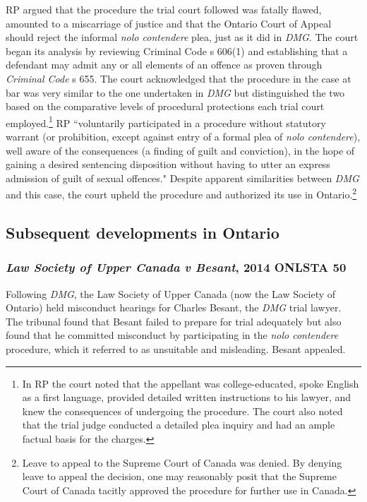 RP argued that the procedure the trial court followed was fatally flawed, amounted to a miscarriage of justice and that the Ontario Court of Appeal should reject the informal \textit{nolo contendere} plea, just as it did in \textit{DMG}. The court began its analysis by reviewing Criminal Code s 606(1) and establishing that a defendant may admit any or all elements of an offence as proven through \textit{Criminal Code} s 655. The court acknowledged that the procedure in the case at bar was very similar to the one undertaken in \textit{DMG} but distinguished the two based on the comparative levels of procedural protections each trial court employed.\footnote{In RP the court noted that the appellant was college-educated, spoke English as a first language, provided detailed written instructions to his lawyer, and knew the consequences of undergoing the procedure. The court also noted that the trial judge conducted a detailed plea inquiry and had an ample factual basis for the charges.} RP ``voluntarily participated in a procedure without statutory warrant (or prohibition, except against entry of a formal plea of \textit{nolo contendere}), well aware of the consequences (a finding of guilt and conviction), in the hope of gaining a desired sentencing disposition without having to utter an express admission of guilt of sexual offences." Despite apparent similarities between \textit{DMG} and this case, the court upheld the procedure and authorized its use in Ontario.\footnote{Leave to appeal to the Supreme Court of Canada was denied. By denying leave to appeal the decision, one may reasonably posit that the Supreme Court of Canada tacitly approved the procedure for further use in Canada.}

\subsection{Subsequent developments in Ontario}

\subsubsection{\textit{Law Society of Upper Canada v Besant}, 2014 ONLSTA 50}

Following \textit{DMG}, the Law Society of Upper Canada (now the Law Society of Ontario) held misconduct hearings for Charles Besant, the \textit{DMG} trial lawyer. The tribunal found that Besant failed to prepare for trial adequately but also found that he committed misconduct by participating in the \textit{nolo contendere} procedure, which it referred to as unsuitable and misleading. Besant appealed.

